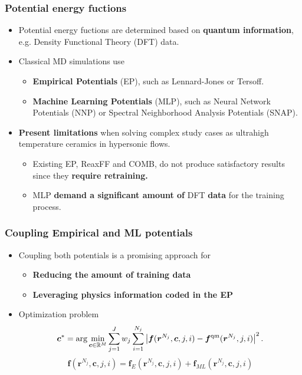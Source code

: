 \documentclass[10pt]{beamer}
\theoremstyle{remark}
\theoremstyle{definition}
\begin{document}
\begin{frame}
\frametitle{Potential energy fuctions}

\begin{itemize}
\item Potential energy fuctions are determined based on \textbf{quantum information}, e.g. Density Functional Theory (DFT) data.
\pause
\item Classical MD simulations use 
\begin{itemize}
    \item \textbf{Empirical Potentials} (EP), such as Lennard-Jones or Tersoff.
    \item \textbf{Machine Learning Potentials} (MLP), such as Neural Network Potentials (NNP) or Spectral Neighborhood Analysis Potentials (SNAP).
\end{itemize}
\pause
\item \textbf{Present limitations} when solving complex study cases as ultrahigh temperature ceramics in hypersonic flows.
\begin{itemize}
    \item Existing EP, ReaxFF and COMB, do not produce satisfactory results since they \textbf{require retraining.}
    \item MLP \textbf{demand a significant amount of} DFT \textbf{data} for the training process.
\end{itemize}
\end{itemize}
 
\end{frame}
	



\begin{frame}
\frametitle{Coupling Empirical and ML potentials}

\begin{itemize}
\item Coupling both potentials is a promising approach for
	\begin{itemize}
    	\item \textbf{Reducing the amount of training data}
	    \item \textbf{Leveraging physics information coded in the EP}
	\end{itemize}
\pause
\item Optimization problem
\begin{equation*}
\bm c^* = \arg \min_{\bm c \in \mathbb{R}^M } \sum_{j=1}^J w_j \sum_{i=1}^{N_j}  \left|\bm f(\bm {r}^{N_j}, \bm c, j, i) - \bm f^{\rm qm}(\bm r^{N_j}, j, i) \right|^2.
\end{equation*}
\pause
\begin{equation*}
    \bm f(\bm {r}^{N_j}, \bm c, j, i) = 
    \bm f_{E}(\bm {r}^{N_j}, \bm c, j, i) +
    \bm f_{ML}(\bm {r}^{N_j}, \bm c, j, i)
\end{equation*}
\end{itemize}
\end{frame}
\end{document}
